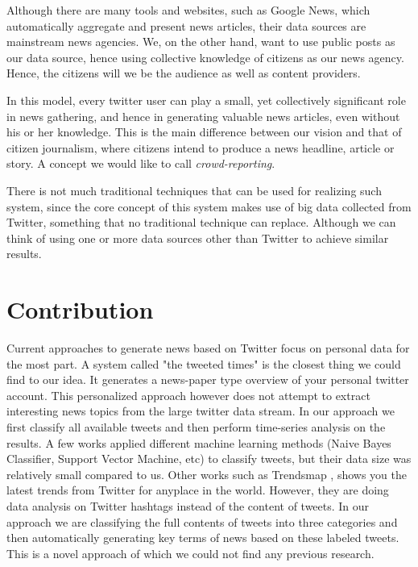 \documentclass{llncs}
\begin{document}
Although there are many tools and websites, such as Google News, which automatically aggregate and present news articles, their data sources are  mainstream news agencies. We, on the other hand, want to use public posts as our data source, hence using collective knowledge of citizens as our news agency. Hence, the citizens will we be the audience as well as content providers.

In this model, every twitter user can play a small, yet collectively significant role in news gathering, and hence in generating valuable news articles, even without his or her knowledge. This is the main difference between our vision and that of citizen journalism, where citizens intend to produce a news headline, article or story. A concept we would like to call \textit{crowd-reporting}.

There is not much traditional techniques that can be used for realizing such system, since the core concept of this system makes use of big data collected from Twitter, something that no traditional technique can replace. Although we can think of using one or more data sources other than Twitter to achieve similar results.

\section{Contribution}
Current approaches to generate news based on Twitter focus on personal data for the most part. A system called "the tweeted times" is the closest thing we could find to our idea. It generates a news-paper type overview of your personal twitter account. This personalized approach however does not attempt to extract interesting news topics from the large twitter data stream. In our approach we first classify all available tweets and then perform time-series analysis on the results. A few works \cite{Go_Bhayani_Huang_2009,twitter-classifier} applied different machine learning methods (Naive Bayes Classifier, Support Vector Machine, etc) to classify tweets, but their data size was relatively small compared to us. Other works such as Trendsmap \cite{Trendmap}, shows you the latest trends from Twitter for anyplace in the world. However, they are doing data analysis on Twitter hashtags instead of the content of tweets. In our approach we are classifying the full contents of tweets into three categories and then automatically generating key terms of news based on these labeled tweets. This is a novel approach of which we could not find any previous research.
\end{document}
